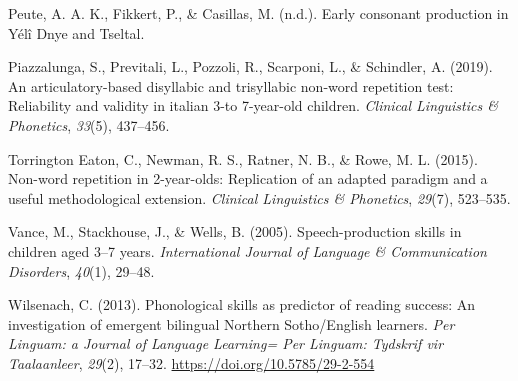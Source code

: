\documentclass[english,,man,floatsintext]{apa6}
\begin{document}
\leavevmode\hypertarget{ref-peuteIPconsonants}{}%
Peute, A. A. K., Fikkert, P., \& Casillas, M. (n.d.). Early consonant production in Yélî Dnye and Tseltal.

\leavevmode\hypertarget{ref-piazzalunga2019articulatory}{}%
Piazzalunga, S., Previtali, L., Pozzoli, R., Scarponi, L., \& Schindler, A. (2019). An articulatory-based disyllabic and trisyllabic non-word repetition test: Reliability and validity in italian 3-to 7-year-old children. \emph{Clinical Linguistics \& Phonetics}, \emph{33}(5), 437--456.

\leavevmode\hypertarget{ref-torrington2015non}{}%
Torrington Eaton, C., Newman, R. S., Ratner, N. B., \& Rowe, M. L. (2015). Non-word repetition in 2-year-olds: Replication of an adapted paradigm and a useful methodological extension. \emph{Clinical Linguistics \& Phonetics}, \emph{29}(7), 523--535.

\leavevmode\hypertarget{ref-vance2005speech}{}%
Vance, M., Stackhouse, J., \& Wells, B. (2005). Speech-production skills in children aged 3--7 years. \emph{International Journal of Language \& Communication Disorders}, \emph{40}(1), 29--48.

\leavevmode\hypertarget{ref-wilsenach2013phonological}{}%
Wilsenach, C. (2013). Phonological skills as predictor of reading success: An investigation of emergent bilingual Northern Sotho/English learners. \emph{Per Linguam: a Journal of Language Learning= Per Linguam: Tydskrif vir Taalaanleer}, \emph{29}(2), 17--32. \url{https://doi.org/10.5785/29-2-554}
\end{document}
